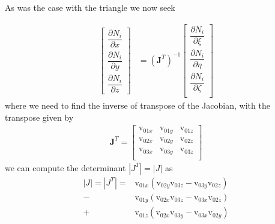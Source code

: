 \documentclass[11pt,letterpaper,titlepage]{article}
\newcommand{\beqn}{\begin{equation}
	\begin{aligned}}
\newcommand{\eeqn}{\end{aligned}
	\end{equation}}
\numberwithin{equation}{section}
\begin{document}
As was the case with the triangle we now seek

\begingroup
\renewcommand*{\arraystretch}{1.5}
\beqn \label{eq:derivativeNtetrahedron}
\begin{bmatrix}
\dfrac{\partial N_i}{\partial x} \\
\dfrac{\partial N_i}{\partial y} \\
\dfrac{\partial N_i}{\partial z}
\end{bmatrix}
&=
(\mathbf{J}^T)^{-1}
\begin{bmatrix}
\dfrac{\partial N_i}{\partial \xi} \\
\dfrac{\partial N_i}{\partial \eta} \\
\dfrac{\partial N_i}{\partial \zeta} \\
\end{bmatrix}
\eeqn 
\endgroup
where we need to find the inverse of transpose of the Jacobian, with the transpose given by
\begingroup
\renewcommand*{\arraystretch}{1.5}
\beqn \label{eq:jacobiantransposetetrahedron} 
\mathbf{J }^T=
\begin{bmatrix}
\text{v}_{01x}  & \text{v}_{01y} & \text{v}_{01z}  \\
\text{v}_{02x}  & \text{v}_{02y} & \text{v}_{02z}  \\
\text{v}_{03x}  & \text{v}_{03y} & \text{v}_{03z}  \\
\end{bmatrix}
\eeqn
\endgroup
we can compute the determinant $|J^T|=|J|$  as
\beqn 
|J| = |J^T| =& \text{v}_{01x}       (\text{v}_{02y} \text{v}_{03z}    - \text{v}_{03y}  \text{v}_{02z} ) \\
     - &\text{v}_{01y}       (\text{v}_{02x} \text{v}_{03z}    - \text{v}_{03x}  \text{v}_{02z} ) \\
     + &\text{v}_{01z}       (\text{v}_{02x} \text{v}_{03y}    - \text{v}_{03x}  \text{v}_{02y} )
\eeqn
\end{document}
